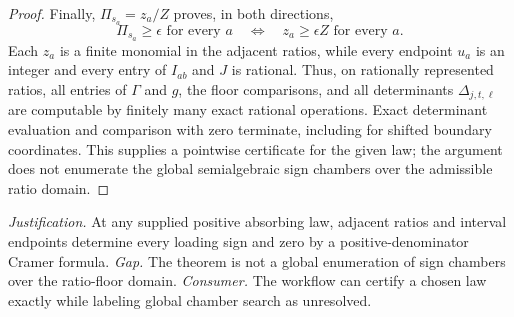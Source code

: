 \documentclass{article}
\begin{document}
\begin{proof}
Finally, \(\Pi_{s_a}=z_a/Z\) proves, in both directions,
\[
 \Pi_{s_a}\geq\epsilon\text{ for every }a
 \quad\Longleftrightarrow\quad
 z_a\geq\epsilon Z\text{ for every }a.
\]
Each \(z_a\) is a finite monomial in the adjacent ratios, while every endpoint \(u_a\) is an integer and every entry of \(I_{ab}\) and \(J\) is rational.  Thus, on rationally represented ratios, all entries of \(\Gamma\) and \(g\), the floor comparisons, and all determinants \(\Delta_{j,t,\ell}\) are computable by finitely many exact rational operations.  Exact determinant evaluation and comparison with zero terminate, including for shifted boundary coordinates.  This supplies a pointwise certificate for the given law; the argument does not enumerate the global semialgebraic sign chambers over the admissible ratio domain.
\end{proof}
\par\smallskip\noindent \textit{Justification.} At any supplied positive absorbing law, adjacent ratios and interval endpoints determine every loading sign and zero by a positive-denominator Cramer formula. \textit{Gap.} The theorem is not a global enumeration of sign chambers over the ratio-floor domain. \textit{Consumer.} The workflow can certify a chosen law exactly while labeling global chamber search as unresolved.
\end{document}
